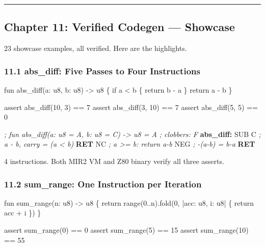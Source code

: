 \documentclass[
  11pt,
  a4paper,
]{report}
\newenvironment{Shaded}{\begin{snugshade}\small}{\end{snugshade}}
\newcommand{\BuiltInTok}[1]{#1}
\newcommand{\CommentTok}[1]{\textcolor[rgb]{0.56,0.35,0.01}{\textit{#1}}}
\newcommand{\ControlFlowTok}[1]{\textcolor[rgb]{0.13,0.29,0.53}{\textbf{#1}}}
\newcommand{\FunctionTok}[1]{\textcolor[rgb]{0.13,0.29,0.53}{\textbf{#1}}}
\newcommand{\NormalTok}[1]{#1}
\begin{document}
\begin{center}\rule{0.5\linewidth}{0.5pt}\end{center}

\subsection{Chapter 11: Verified Codegen ---
Showcase}\label{chapter-11-verified-codegen-showcase}

23 showcase examples, all verified. Here are the highlights.

\subsubsection{11.1 abs\_diff: Five Passes to Four
Instructions}\label{abs_diff-five-passes-to-four-instructions}

\begin{Shaded}
\begin{Highlighting}[]
\NormalTok{fun abs\_diff(a: u8, b: u8) {-}\textgreater{} u8 \{}
\NormalTok{    if a \textless{} b \{ return b {-} a \}}
\NormalTok{    return a {-} b}
\NormalTok{\}}

\NormalTok{assert abs\_diff(10, 3) == 7}
\NormalTok{assert abs\_diff(3, 10) == 7}
\NormalTok{assert abs\_diff(5, 5)  == 0}
\end{Highlighting}
\end{Shaded}

\begin{Shaded}
\begin{Highlighting}[]
\CommentTok{; fun abs\_diff(a: u8 = A, b: u8 = C) {-}\textgreater{} u8 = A ; clobbers: F}
\FunctionTok{abs\_diff:}
    \BuiltInTok{SUB}\NormalTok{ C       }\CommentTok{; a {-} b, carry = (a \textless{} b)}
    \ControlFlowTok{RET}\NormalTok{ NC      }\CommentTok{; a \textgreater{}= b: return a{-}b}
    \BuiltInTok{NEG}         \CommentTok{; {-}(a{-}b) = b{-}a}
    \ControlFlowTok{RET}
\end{Highlighting}
\end{Shaded}

4 instructions. Both MIR2 VM and Z80 binary verify all three asserts.

\subsubsection{11.2 sum\_range: One Instruction per
Iteration}\label{sum_range-one-instruction-per-iteration}

\begin{Shaded}
\begin{Highlighting}[]
\NormalTok{fun sum\_range(n: u8) {-}\textgreater{} u8 \{}
\NormalTok{    return range(0..n).fold(0, |acc: u8, i: u8| \{ return acc + i \})}
\NormalTok{\}}

\NormalTok{assert sum\_range(0)  == 0}
\NormalTok{assert sum\_range(5)  == 15}
\NormalTok{assert sum\_range(10) == 55}
\end{Highlighting}
\end{Shaded}
\end{document}
